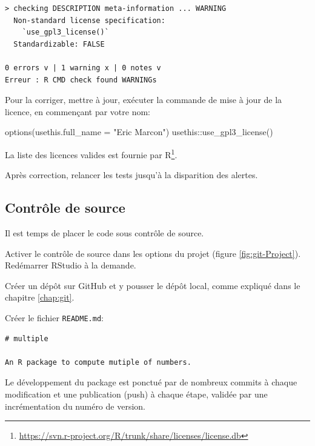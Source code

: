\documentclass[
  11pt,
  french,
  a4paper,
  extrafontsizes,onecolumn,openright
  ]{memoir}
\newenvironment{Shaded}{\begin{snugshade}}{\end{snugshade}}
\newcommand{\AttributeTok}[1]{\textcolor[rgb]{0.77,0.63,0.00}{#1}}
\newcommand{\FunctionTok}[1]{\textcolor[rgb]{0.00,0.00,0.00}{#1}}
\newcommand{\NormalTok}[1]{#1}
\newcommand{\SpecialCharTok}[1]{\textcolor[rgb]{0.00,0.00,0.00}{#1}}
\newcommand{\StringTok}[1]{\textcolor[rgb]{0.31,0.60,0.02}{#1}}
\begin{document}
\begin{verbatim}
> checking DESCRIPTION meta-information ... WARNING
  Non-standard license specification:
    `use_gpl3_license()`
  Standardizable: FALSE

0 errors v | 1 warning x | 0 notes v
Erreur : R CMD check found WARNINGs
\end{verbatim}

Pour la corriger, mettre à jour, exécuter la commande de mise à jour de la licence, en commençant par votre nom:

\scriptsize

\begin{Shaded}
\begin{Highlighting}[]
\FunctionTok{options}\NormalTok{(}\AttributeTok{usethis.full\_name =} \StringTok{"Eric Marcon"}\NormalTok{)}
\NormalTok{usethis}\SpecialCharTok{::}\FunctionTok{use\_gpl3\_license}\NormalTok{()}
\end{Highlighting}
\end{Shaded}

\normalsize

La liste des licences valides est fournie par R\footnote{\url{https://svn.r-project.org/R/trunk/share/licenses/license.db}}.

Après correction, relancer les tests jusqu'à la disparition des alertes.

\hypertarget{sec:package-cds}{%
\subsection{Contrôle de source}\label{sec:package-cds}}

Il est temps de placer le code sous contrôle de source.

Activer le contrôle de source dans les options du projet (figure \ref{fig:git-Project}).
Redémarrer RStudio à la demande.

Créer un dépôt sur GitHub et y pousser le dépôt local, comme expliqué dans le chapitre \ref{chap:git}.

Créer le fichier \texttt{README.md}:

\begin{verbatim}
# multiple

An R package to compute mutiple of numbers.
\end{verbatim}

Le développement du package est ponctué par de nombreux commits à chaque modification et une publication (push) à chaque étape, validée par une incrémentation du numéro de version.
\end{document}
